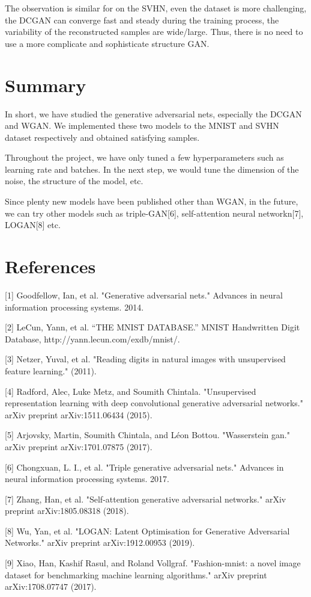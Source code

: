 \documentclass{article}
\begin{document}
The observation is similar for on the SVHN, even the dataset is more challenging, the DCGAN can converge fast and steady during the training process, the variability of the reconstructed samples are wide/large. Thus, there is no need to use a more complicate and sophisticate structure GAN. 

\section{Summary}

In short, we have studied the generative adversarial nets, especially the DCGAN and WGAN. We implemented these two models to the MNIST and SVHN dataset respectively and obtained satisfying samples.

Throughout the project, we have only tuned a few hyperparameters such as learning rate and batches. In the next step, we would tune the dimension of the noise, the structure of the model, etc.

Since plenty new models have been published other than WGAN, in the future, we can try other models such as triple-GAN[6], self-attention neural networkn[7], LOGAN[8] etc.

\section*{References}

[1] Goodfellow, Ian, et al. "Generative adversarial nets." Advances in neural information processing systems. 2014.

[2] LeCun, Yann, et al. “THE MNIST DATABASE.” MNIST Handwritten Digit Database, http://yann.lecun.com/exdb/mnist/.

[3] Netzer, Yuval, et al. "Reading digits in natural images with unsupervised feature learning." (2011).

[4] Radford, Alec, Luke Metz, and Soumith Chintala. "Unsupervised representation learning with deep convolutional generative adversarial networks." arXiv preprint arXiv:1511.06434 (2015).

[5] Arjovsky, Martin, Soumith Chintala, and Léon Bottou. "Wasserstein gan." arXiv preprint arXiv:1701.07875 (2017).

[6] Chongxuan, L. I., et al. "Triple generative adversarial nets." Advances in neural information processing systems. 2017.

[7] Zhang, Han, et al. "Self-attention generative adversarial networks." arXiv preprint arXiv:1805.08318 (2018).

[8] Wu, Yan, et al. "LOGAN: Latent Optimisation for Generative Adversarial Networks." arXiv preprint arXiv:1912.00953 (2019).

[9] Xiao, Han, Kashif Rasul, and Roland Vollgraf. "Fashion-mnist: a novel image dataset for benchmarking machine learning algorithms." arXiv preprint arXiv:1708.07747 (2017).
\end{document}
